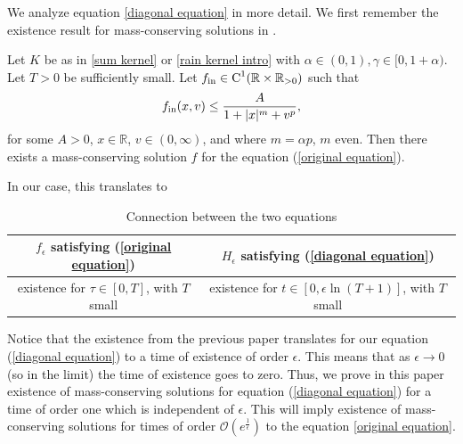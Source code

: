 \documentclass[11pt]{article}
\numberwithin{equation}{section}
\begin{document}
We analyze equation \eqref{diagonal equation} in more detail. We first remember the existence result for mass-conserving solutions in \cite{cristianinhom}. 
\begin{teo}\label{main theorem} Let $K$ be as in \eqref{sum kernel} or \eqref{rain kernel intro} with $\alpha\in(0,1), \gamma\in[0,1+\alpha)$. Let $T>0$ be sufficiently small. Let $f_{\textup{in}}\in \textup{C}^{1}(\mathbb{R}\times\mathbb{R}_{> 0})$ such that
\begin{align*}
    f_{\textup{in}}(x,v)\leq \frac{A}{1+|x|^{m}+v^{p}},
\end{align*}
for some $A>0$, $x\in\mathbb{R}$, $v\in(0,\infty)$, and where $m=\alpha p$, $m$ even. Then there exists a mass-conserving solution $f$ for the equation (\ref{original equation}).
\end{teo}
In our case, this translates to

\begin{table}[H]
    \centering
    \begin{tabular}{|c||c|}
    \hline
     $f_{\epsilon}$ satisfying (\ref{original equation})& $H_{\epsilon}$ satisfying (\ref{diagonal equation})\\
        \hline
        \hline
         existence for $\tau\in[0,T]$, with $T$ small &  existence for $t\in[0,\epsilon\ln(T+1)]$, with $T$ small\\
         \hline
    \end{tabular}
    \caption{Connection between the two equations}
    \label{tab:my_label}
\end{table}

\begin{rmk}\label{remark absence of uniform time}
Notice that the existence from the previous paper translates for our equation (\ref{diagonal equation}) to a time of existence of order $\epsilon$. This means that as $\epsilon\rightarrow 0$ (so in the limit) the time of existence goes to zero. Thus, we prove in this paper existence of mass-conserving solutions for equation (\ref{diagonal equation})  for a time of order one which is independent of $\epsilon$. This will imply existence of mass-conserving solutions for times of order $\mathcal{O}(e^{\frac{1}{\epsilon}})$ to the equation \eqref{original equation}.
\end{rmk}
\end{document}
